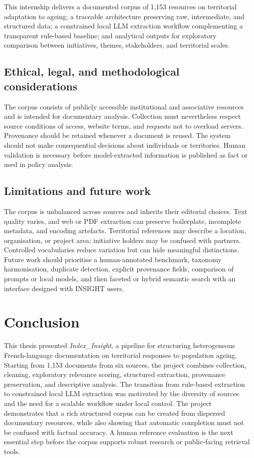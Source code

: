 This internship delivers a documented corpus of 1,153 resources on territorial
adaptation to ageing; a traceable architecture preserving raw, intermediate,
and structured data; a constrained local LLM extraction workflow complementing
a transparent rule-based baseline; and analytical outputs for exploratory
comparison between initiatives, themes, stakeholders, and territorial scales.

\section{Ethical, legal, and methodological considerations}

The corpus consists of publicly accessible institutional and associative
resources and is intended for documentary analysis. Collection must nevertheless
respect source conditions of access, website terms, and requests not to overload
servers. Provenance should be retained whenever a document is reused. The system
should not make consequential decisions about individuals or territories. Human
validation is necessary before model-extracted information is published as fact
or used in policy analysis.

\section{Limitations and future work}

The corpus is unbalanced across sources and inherits their editorial choices.
Text quality varies, and web or PDF extraction can preserve boilerplate,
incomplete metadata, and encoding artefacts. Territorial references may describe
a location, organisation, or project area; initiative holders may be confused
with partners. Controlled vocabularies reduce variation but can hide meaningful
distinctions. Future work should prioritise a human-annotated benchmark,
taxonomy harmonisation, duplicate detection, explicit provenance fields,
comparison of prompts or local models, and then faceted or hybrid semantic
search with an interface designed with INSIGHT users.

\chapter{Conclusion}

This thesis presented \textit{Index\_Insight}, a pipeline for structuring
heterogeneous French-language documentation on territorial responses to
population ageing. Starting from 1,153 documents from six sources, the project
combines collection, cleaning, exploratory relevance scoring, structured
extraction, provenance preservation, and descriptive analysis. The transition
from rule-based extraction to constrained local LLM extraction was motivated by
the diversity of sources and the need for a scalable workflow under local
control. The project demonstrates that a rich structured corpus can be created
from dispersed documentary resources, while also showing that automatic
completion must not be confused with factual accuracy. A human reference
evaluation is the next essential step before the corpus supports robust research
or public-facing retrieval tools.

